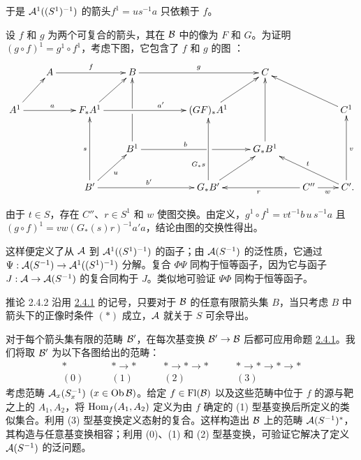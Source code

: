 于是 $\Aa^{1}(\sisi{{S^1}}{(S^1)}^{-1})$ 的箭头\pageoriginale $f^{1}=us^{-1}a$ 只依赖于 $f$。

设 $f$ 和 $g$ 为两个可复合的箭头，其在 $\Bb$ 中的像为 $F$ 和 $G$。为证明 $(g\circ f)^{1}=g^{1}\circ f^{1}$，考虑下图，它包含了 $f$ 和 $g$ 的图 ：
\[
\xymatrix@C=2em{
                      & A \ar[rr]^{f}&      & B\ar[rrr]^{g}     & &
                      & C  &       \\
 A^{1} \ar[ru] \ar[rr]^{a}&          &F_{\ast}A^{1}\ar[ru] \ar[rrr]^(.6){a'}& & & (GF)_{\ast}A^1\ar[ru] &
              & &C^{1}\ar[llu]\\
& & & B^1 \ar[rrr]^(.4){b}|(.58)\hole\ar[uu]|\hole & & & G_{\ast}B^1\ar[uu] &     \\
&  & B'\ar[uu]^{s}\ar[rrr]^{b'}\ar[ru]_{u}       &   & &G_{\ast}B'\ar[ru]\ar[uu]^(.3){G_{\ast}s}    &  &C''\ar[ll]^{r}\ar[r]_{w} & C'\ar[llu]_t\ar[uu]_{v}\rlap{.}
}
\]

由于 $t\in S$，存在 $C''$、$r\in S^{1}$ 和 $w$ 使图交换。由定义，\break $g^{1}\circ f^{1}=vt^{-1}b\,u\,s^{-1}a$ 且 $(g\circ f)^{1}=vw(G_{\ast}(s)r)^{-1}a'a$，结论由图的交换性得出。

这样便定义了从 $\Aa$ 到 $\Aa^{1}(\sisi{{S^1}}{(S^1)}^{-1})$ 的函子；由 $\Aa(S^{-1})$ 的泛性质，它通过 $\Psi:\Aa(S^{-1})\rightarrow\Aa^{1}(\sisi{{S^1}}{(S^1)}^{-1})$ 分解。复合 $\Phi\Psi$ 同构于恒等函子，因为它与函子 $J:\Aa\rightarrow\Aa(S^{-1})$ 的复合同构于 $J$。类似地可验证 $\Psi\Phi$ 同构于恒等函子。

\begin{enonce*}{推论 2.4.2}
沿用 \hyperref[XVII.prop2.4.1]{2.4.1} 的记号，只要对于 $\Bb$ 的任意有限箭头集 $B$，当只考虑 $B$ 中箭头下的正像时条件 $(\ast)$ 成立，$\Aa$ 就关于 $S$ 可余导出。
\end{enonce*}

对于\pageoriginale 每个箭头集有限的范畴 $\Bb'$，在每次基变换 $\Bb'\rightarrow\Bb$ 后都可应用命题 \hyperref[XVII.prop2.4.1]{2.4.1}。我们将取 $\Bb'$ 为以下各图给出的范畴：
\[
  \begin{gathered}
    *\\
    (0)
  \end{gathered}\qquad
  \begin{gathered}
    *\to*\\
    (1)
  \end{gathered}\qquad
  \begin{gathered}
    *\to*\to*\\
    (2)
  \end{gathered}\qquad
  \begin{gathered}
    *\to*\to*\to*\\
    (3)
  \end{gathered}
\]
考虑范畴 $\Aa_x(S^{-1}_x)$ $(x\in\Ob\Bb)$。给定 $f\in\Fl(\Bb)$ 以及这些范畴中位于 $f$ 的源与靶之上的 $A_1,A_2$，将 $\Hom_f(A_1,A_2)$ 定义为由 $f$ 确定的 (1) 型基变换后所定义的类似集合。利用 (3) 型基变换定义态射的复合。这样构造出 $\Bb$ 上的范畴 $\Aa(S^{-1})^{\ast}$，其构造与任意基变换相容；利用 (0)、(1) 和 (2) 型基变换，可验证它解决了定义 $\Aa(S^{-1})$ 的泛问题。

